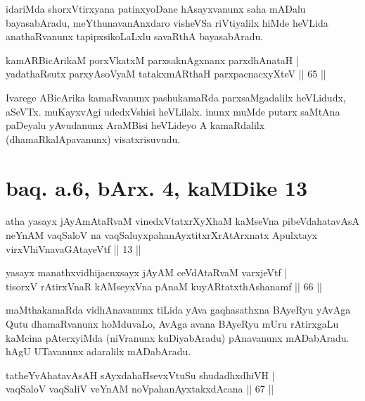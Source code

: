 \begin{artha}
idariMda shorxVtirxyana patinxyoDane hAsayxvanunx saha mADalu bayasabAradu, meYthunavanAnxdaro visheVSa riVtiyalilx hiMde heVLida anathaRvanunx tapipxsikoLaLxlu savaRthA bayasabAradu.
\end{artha}


\begin{shl}
kamAR\s \s BicArikaM porxVkatxM parxsaknAgxnanx parxdhAnataH | \\
yadathaRsutx parxyAsoV\s yaM tatakxmARthaH parxpacnacxyXteV \hfill|| 65 || 
\end{shl}

\begin{artha}
Ivarege ABicArika kamaRvanunx pashukamaRda parxsaMgadalilx heVLidudx, aSeVTx. muKayxvAgi udedxVshisi heVLilalx. inunx muMde putarx saMtAna paDeyalu yAvudanunx AraMBisi heVLideyo A kamaRdalilx (dhamaRkalApavanunx) visatxrisuvudu.
\end{artha}

\section*{baq. a.6, bArx. 4, kaMDike 13}

\begin{shl}
atha yasayx jAyAmAtaRvaM vinedxVtatxrXyXhaM kaMseVna pibeVdahatavAsA neYnAM vaqSaloV na vaqSaluyxpahanAyxtitxrXrAtArxnatx Apulxtayx virxVhiVnavaGAtayeVtf || 13 ||
\end{shl}

\begin{shl}
yasayx manathxvidhijacnxsayx jAyAM ceVdAtaRvaM varxjeVtf | \\
tisorxV rAtirxVnaR kAMseyxVna pAnaM kuyARtatxthA\s shanamf  \hfill|| 66 || 
\end{shl}

\begin{artha}
maMthakamaRda vidhAnavanunx tiLida yAva gaqhasathxna BAyeRyu yAvAga 
Qutu dhamaRvanunx hoMduvaLo, AvAga avana BAyeRyu mUru rAtirxgaLu 
kaMcina pAterxyiMda (niVranunx kuDiyabAradu) pAnavanunx mADabAradu. 
hAgU UTavanunx adaralilx mADabAradu.
\end{artha}


\begin{shl}
tatheYvAhatavAsAH sAyxdahaHsevxVtuSu shudadhxdhiVH | \\
vaqSaloV vaqSaliV veYnAM noVpahanAyxtakxdAcana \hfill|| 67 || 
\end{shl}

